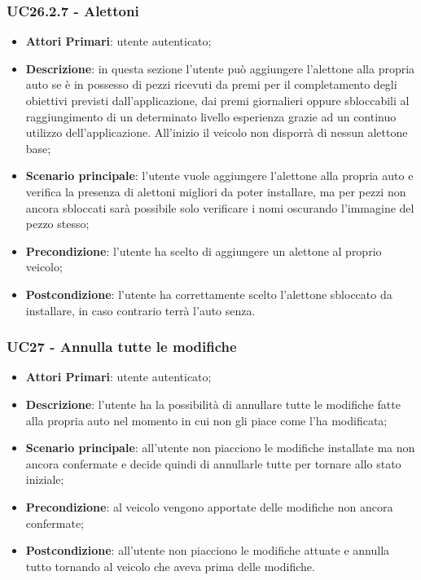 \subsubsection{UC26.2.7 - Alettoni}
\begin{itemize}
	\item \textbf{Attori Primari}: utente autenticato;
	\item \textbf{Descrizione}: in questa sezione l'utente può aggiungere l'alettone alla propria auto se è in possesso di pezzi ricevuti da premi per il completamento degli obiettivi previsti dall'applicazione, dai premi giornalieri oppure sbloccabili al raggiungimento di un determinato livello esperienza grazie ad un continuo utilizzo dell'applicazione.
	All'inizio il veicolo non disporrà di nessun alettone base;
	\item \textbf{Scenario principale}: l'utente vuole aggiungere l'alettone alla propria auto e verifica la presenza di alettoni migliori da poter installare, ma per pezzi non ancora sbloccati sarà possibile solo verificare i nomi oscurando l'immagine del pezzo stesso;
	\item \textbf{Precondizione}: l'utente ha scelto di aggiungere un alettone al proprio veicolo; 
	\item \textbf{Postcondizione}: l'utente ha correttamente scelto l'alettone sbloccato da installare, in caso contrario terrà l'auto senza.
\end{itemize} 

\subsubsection{UC27 - Annulla tutte le modifiche}
\begin{itemize}
	\item \textbf{Attori Primari}: utente autenticato;
	\item \textbf{Descrizione}: l'utente ha la possibilità di annullare tutte le modifiche fatte alla propria auto nel momento in cui non gli piace come l'ha modificata;
	\item \textbf{Scenario principale}: all'utente non piacciono le modifiche installate ma non ancora confermate e decide quindi di annullarle tutte per tornare allo stato iniziale;
	\item \textbf{Precondizione}: al veicolo vengono apportate delle modifiche non ancora confermate; 
	\item \textbf{Postcondizione}: all'utente non piacciono le modifiche attuate e annulla tutto tornando al veicolo che aveva prima delle modifiche.
\end{itemize} 
